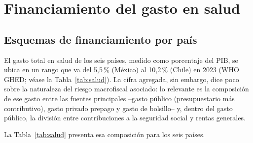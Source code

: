 \documentclass[12pt, letterpaper]{article}
\begin{document}
\section{Financiamiento del gasto en salud}
\label{sec:salud}

\subsection{Esquemas de financiamiento por país}
\label{sec:esquemas-salud}

El gasto total en salud de los seis países, medido como porcentaje del PIB, se ubica
en un rango que va del 5{,}5\,\% (México) al 10{,}2\,\% (Chile) en 2023 (WHO
GHED; véase la Tabla~\ref{tab:salud}). La cifra agregada, sin embargo, dice poco
sobre la naturaleza del riesgo macrofiscal asociado: lo relevante es la composición
de ese gasto entre las fuentes principales --gasto público (presupuestario más
contributivo), gasto privado prepago y gasto de bolsillo-- y, dentro del gasto
público, la división entre contribuciones a la seguridad social y rentas generales.

La Tabla~\ref{tab:salud} presenta esa composición para los seis países.
\end{document}
